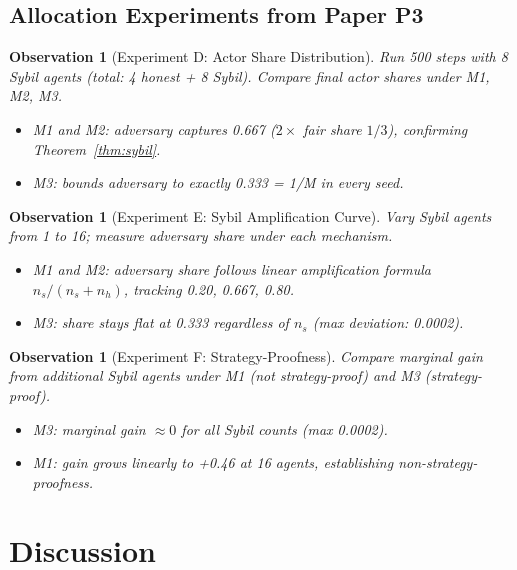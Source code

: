 \documentclass[11pt]{article}
\newtheorem{observation}[theorem]{Observation}
\begin{document}
\subsection{Allocation Experiments from Paper P3}

\begin{observation}[Experiment D: Actor Share Distribution]
\label{obs:exp-d}
Run 500 steps with 8 Sybil agents (total: 4 honest + 8 Sybil). Compare final actor shares under M1, M2, M3.

\begin{itemize}[noitemsep]
  \item M1 and M2: adversary captures 0.667 ($2\times$ fair share $1/3$), confirming Theorem~\ref{thm:sybil}.
  \item M3: bounds adversary to exactly 0.333 = 1/M in every seed.
\end{itemize}
\end{observation}

\begin{observation}[Experiment E: Sybil Amplification Curve]
\label{obs:exp-e}
Vary Sybil agents from 1 to 16; measure adversary share under each mechanism.

\begin{itemize}[noitemsep]
  \item M1 and M2: adversary share follows linear amplification formula $n_s/(n_s+n_h)$, tracking 0.20, 0.667, 0.80.
  \item M3: share stays flat at 0.333 regardless of $n_s$ (max deviation: 0.0002).
\end{itemize}
\end{observation}

\begin{observation}[Experiment F: Strategy-Proofness]
\label{obs:exp-f}
Compare marginal gain from additional Sybil agents under M1 (not strategy-proof) and M3 (strategy-proof).

\begin{itemize}[noitemsep]
  \item M3: marginal gain $\approx 0$ for all Sybil counts (max 0.0002).
  \item M1: gain grows linearly to +0.46 at 16 agents, establishing non-strategy-proofness.
\end{itemize}
\end{observation}

\section{Discussion}
\label{sec:discussion}
\end{document}
